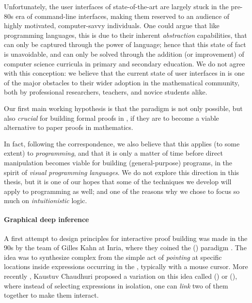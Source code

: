 Unfortunately, the user interfaces of state-of-the-art  are
largely stuck in the pre-80s era of command-line interfaces, making them
reserved to an audience of highly motivated, computer-savvy individuals. One
could argue that like programming languages, this is due to their inherent
\emph{abstraction} capabilities, that can only be captured through the
 power of language; hence that this state of fact is unavoidable,
and can only be solved through the addition (or improvement) of computer science
curricula in primary and secondary education. We do not agree with this
conception: we believe that the current state of user interfaces in  is
one of the major obstacles to their wider adoption in the mathematical
community, both by professional researchers, teachers, and novice students
alike.

\begin{emphpar}
  Our first main working hypothesis is that the 
  paradigm is not only possible, but also \emph{crucial} for building formal
  proofs in , if they are to become a viable alternative to paper
  proofs in mathematics.
\end{emphpar}

In fact, following the  correspondence, we also believe
that this applies (to some extent) to \emph{programming}, and that it is only a
matter of time before direct manipulation becomes viable for building
(general-purpose) programs, in the spirit of \emph{visual programming
languages}. We do not explore this direction in this thesis, but it is one of
our hopes that some of the techniques we develop will apply to programming as
well; and one of the reasons why we chose to focus so much on
\emph{intuitionistic} logic.

\paragraph{Graphical deep inference}

\AP
A first attempt to design  principles for interactive
proof building was made in the 90s by the team of Gilles Kahn at Inria, where
they coined the  () paradigm
. The idea was to synthesize complex  from the simple
act of \emph{pointing} at specific locations inside expressions occurring in the
, typically with a mouse cursor. More recently
, Kaustuv Chaudhuri proposed a variation on this idea
called  () or 
(), where instead of selecting expressions in isolation, one can
\emph{link} two of them together to make them interact.

